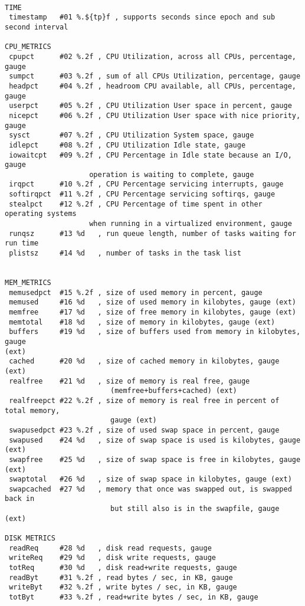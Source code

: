 \begin{verbatim}

TIME
 timestamp   #01 %.${tp}f , supports seconds since epoch and sub second interval

CPU_METRICS
 cpupct      #02 %.2f , CPU Utilization, across all CPUs, percentage, gauge
 sumpct      #03 %.2f , sum of all CPUs Utilization, percentage, gauge
 headpct     #04 %.2f , headroom CPU available, all CPUs, percentage, gauge
 userpct     #05 %.2f , CPU Utilization User space in percent, gauge
 nicepct     #06 %.2f , CPU Utilization User space with nice priority, gauge
 sysct       #07 %.2f , CPU Utilization System space, gauge
 idlepct     #08 %.2f , CPU Utilization Idle state, gauge
 iowaitcpt   #09 %.2f , CPU Percentage in Idle state because an I/O, gauge
                    operation is waiting to complete, gauge
 irqpct      #10 %.2f , CPU Percentage servicing interrupts, gauge
 softirqpct  #11 %.2f , CPU Percentage servicing softirqs, gauge
 stealpct    #12 %.2f , CPU Percentage of time spent in other operating systems
                    when running in a virtualized environment, gauge
 runqsz      #13 %d   , run queue length, number of tasks waiting for run time
 plistsz     #14 %d   , number of tasks in the task list


MEM_METRICS
 memusedpct  #15 %.2f , size of used memory in percent, gauge
 memused     #16 %d   , size of used memory in kilobytes, gauge (ext)
 memfree     #17 %d   , size of free memory in kilobytes, gauge (ext)
 memtotal    #18 %d   , size of memory in kilobytes, gauge (ext)
 buffers     #19 %d   , size of buffers used from memory in kilobytes, gauge
(ext)
 cached      #20 %d   , size of cached memory in kilobytes, gauge (ext)
 realfree    #21 %d   , size of memory is real free, gauge
                         (memfree+buffers+cached) (ext)
 realfreepct #22 %.2f , size of memory is real free in percent of total memory,
                         gauge (ext)
 swapusedpct #23 %.2f , size of used swap space in percent, gauge
 swapused    #24 %d   , size of swap space is used is kilobytes, gauge (ext)
 swapfree    #25 %d   , size of swap space is free in kilobytes, gauge (ext)
 swaptotal   #26 %d   , size of swap space in kilobytes, gauge (ext)
 swapcached  #27 %d   , memory that once was swapped out, is swapped back in
                         but still also is in the swapfile, gauge (ext)

DISK METRICS
 readReq     #28 %d   , disk read requests, gauge
 writeReq    #29 %d   , disk write requests, gauge
 totReq      #30 %d   , disk read+write requests, gauge
 readByt     #31 %.2f , read bytes / sec, in KB, gauge
 writeByt    #32 %.2f , write bytes / sec, in KB, gauge
 totByt      #33 %.2f , read+write bytes / sec, in KB, gauge



\end{verbatim}
